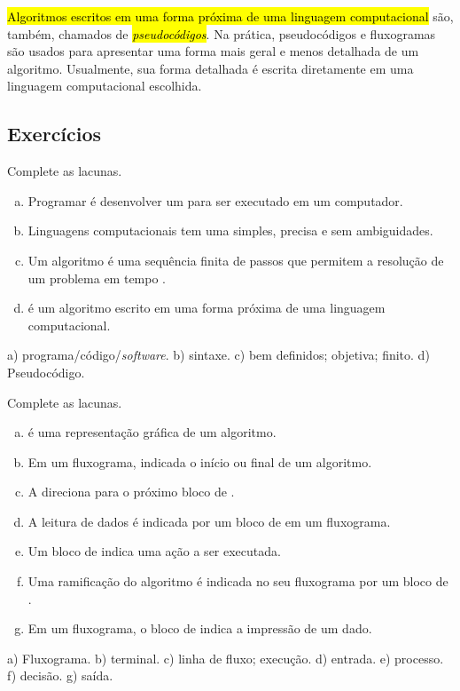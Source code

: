 \hl{Algoritmos escritos em uma forma próxima de uma linguagem computacional} são, também, chamados de \hl{\emph{pseudocódigos}}. Na prática, pseudocódigos e fluxogramas são usados para apresentar uma forma mais geral e menos detalhada de um algoritmo. Usualmente, sua forma detalhada é escrita diretamente em uma linguagem computacional escolhida.

\subsection{Exercícios}

\begin{exer}
  Complete as lacunas.
  \begin{enumerate}[a)]
    \item Programar é desenvolver um \underline{} para ser executado em um computador.
    \item Linguagens computacionais tem uma \underline{\phantom{sintaxe}} simples, precisa e sem ambiguidades.
    \item Um algoritmo é uma sequência finita de passos \underline{\phantom{bem definidos}} que permitem a resolução \underline{\phantom{objetiva}} de um problema em tempo \underline{\phantom{finito}}.
    \item \underline{\phantom{Pseudocódigo}} é um algoritmo escrito em uma forma próxima de uma linguagem computacional.
  \end{enumerate}
\end{exer}
\begin{resp}
  a) programa/código/\textit{software}. b) sintaxe. c) bem definidos; objetiva; finito. d) Pseudocódigo.
\end{resp}

\begin{exer}
  Complete as lacunas.
  \begin{enumerate}[a)]
    \item \underline{\phantom{Fluxograma}} é uma representação gráfica de um algoritmo.
    \item Em um fluxograma, \underline{\phantom{terminal}} indicada o início ou final de um algoritmo.
    \item A \underline{\phantom{linha de fluxo}} direciona para o próximo bloco de \underline{\phantom{execução}}.
    \item A leitura de dados é indicada por um bloco de \underline{\phantom{entrada}} em um fluxograma.
    \item Um bloco de \underline{\phantom{processo}} indica uma ação a ser executada.
    \item Uma ramificação do algoritmo é indicada no seu fluxograma por um bloco de \underline{\phantom{decisão}}.
    \item Em um fluxograma, o bloco de \underline{\phantom{saída}} indica a impressão de um dado.
  \end{enumerate} 
\end{exer}
\begin{resp}
  a) Fluxograma. b) terminal. c) linha de fluxo; execução. d) entrada. e) processo. f) decisão. g) saída.
\end{resp}

